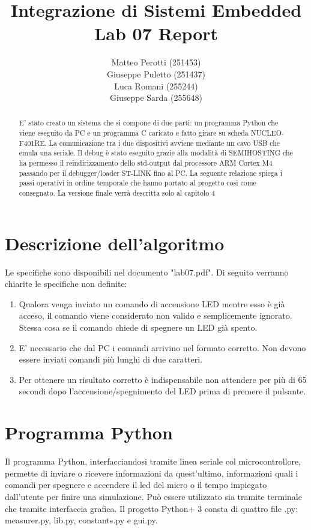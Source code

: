 \documentclass[a4paper]{article}
\title{Integrazione di Sistemi Embedded\\Lab 07 Report}
\author{Matteo Perotti (251453)\\Giuseppe Puletto (251437)\\Luca Romani (255244)\\Giuseppe Sarda (255648)}
\begin{document}
\maketitle

\newpage

\begin{abstract}
	E' stato creato un sistema che si compone di due parti: un programma Python che viene eseguito da PC e un programma C caricato e fatto girare su scheda NUCLEO-F401RE. La comunicazione tra i due dispositivi avviene mediante un cavo USB che emula una seriale. 
	Il debug è stato eseguito grazie alla modalità di SEMIHOSTING che ha permesso il reindirizzamento dello std-output dal processore ARM Cortex M4 passando per il debugger/loader ST-LINK fino al PC.\newline
	La seguente relazione spiega i passi operativi in ordine temporale che hanno portato al progetto così come consegnato. La versione finale verrà descritta solo al capitolo 4
\end{abstract}

\section{Descrizione dell'algoritmo}
Le specifiche sono disponibili nel documento "lab07.pdf". Di seguito verranno chiarite le specifiche non definite:
\begin{enumerate}
	\item Qualora venga inviato un comando di accensione LED mentre esso è già acceso, il comando viene considerato non valido e semplicemente ignorato. Stessa cosa se il comando chiede di spegnere un LED già spento.
	\item E' necessario che dal PC i comandi arrivino nel formato corretto. Non devono essere inviati comandi più lunghi di due caratteri.
	\item Per ottenere un risultato corretto è indispensabile non attendere per più di 65 secondi dopo l'accensione/spegnimento del LED prima di premere il pulsante.
\end{enumerate}

\section{Programma Python}
Il programma Python, interfacciandosi tramite linea seriale col microcontrollore, permette di inviare o ricevere informazioni da quest'ultimo, informazioni quali i comandi per spegnere e accendere il led del micro o il tempo impiegato dall'utente per finire una simulazione. Pu\`{o} essere utilizzato sia tramite terminale che tramite interfaccia grafica. Il progetto Python+
3 consta di quattro file .py: measurer.py, lib.py, constants.py e gui.py.
\end{document}
